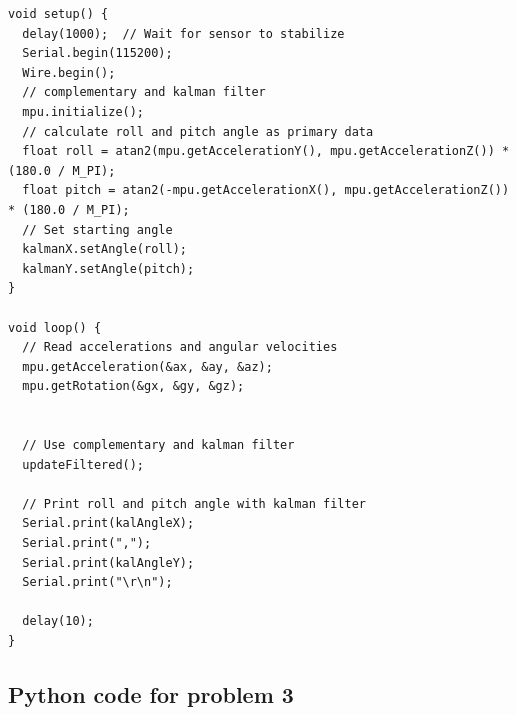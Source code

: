 \documentclass[conference]{IEEEtran}
\begin{document}
\begin{lstlisting}[style=Arduino]
void setup() {
  delay(1000);  // Wait for sensor to stabilize
  Serial.begin(115200);
  Wire.begin();
  // complementary and kalman filter
  mpu.initialize();
  // calculate roll and pitch angle as primary data
  float roll = atan2(mpu.getAccelerationY(), mpu.getAccelerationZ()) * (180.0 / M_PI);
  float pitch = atan2(-mpu.getAccelerationX(), mpu.getAccelerationZ()) * (180.0 / M_PI);
  // Set starting angle
  kalmanX.setAngle(roll);
  kalmanY.setAngle(pitch);
}

void loop() {
  // Read accelerations and angular velocities
  mpu.getAcceleration(&ax, &ay, &az);
  mpu.getRotation(&gx, &gy, &gz);


  // Use complementary and kalman filter
  updateFiltered();

  // Print roll and pitch angle with kalman filter
  Serial.print(kalAngleX);
  Serial.print(",");
  Serial.print(kalAngleY);
  Serial.print("\r\n");

  delay(10);
}

\end{lstlisting}

\subsection{Python code for problem 3}
\end{document}

